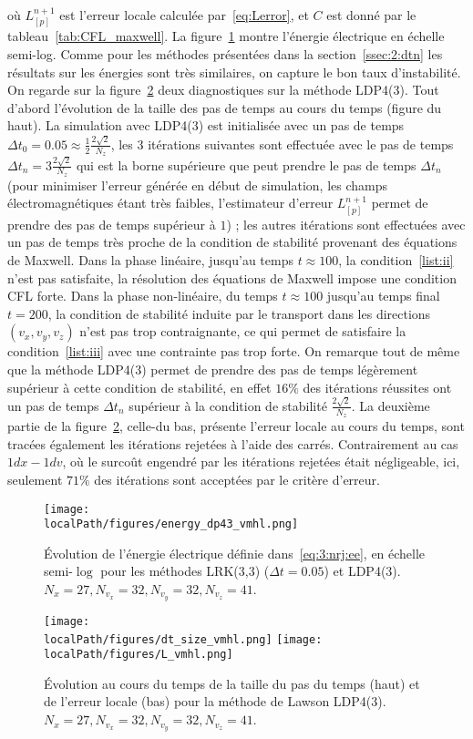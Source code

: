 où $L_{[p]}^{n+1}$ est l'erreur locale calculée par~\ref{eq:Lerror}, et $C$ est donné par le tableau~\ref{tab:CFL_maxwell}. La figure~\ref{fig:energieselecdp43} montre l'énergie électrique en échelle semi-log. Comme pour les méthodes présentées dans la section~\ref{ssec:2:dtn} les résultats sur les énergies sont très similaires, on capture le bon taux d'instabilité. On regarde sur la figure~\ref{fig:dtanderrordp43} deux diagnostiques sur la méthode LDP4(3). Tout d'abord l'évolution de la taille des pas de temps au cours du temps (figure du haut). La simulation avec LDP4(3) est initialisée avec un pas de temps $\Delta t_0=0.05\approx\frac{1}{2}\frac{2\sqrt{2}}{N_z}$, les 3 itérations suivantes sont effectuée avec le pas de temps $\Delta t_n=3\frac{2\sqrt{2}}{N_z}$ qui est la borne supérieure que peut prendre le pas de temps $\Delta t_n$ (pour minimiser l'erreur générée en début de simulation, les champs électromagnétiques étant très faibles, l'estimateur d'erreur $L_{[p]}^{n+1}$ permet de prendre des pas de temps supérieur à $1$) ; les autres itérations sont effectuées avec un pas de temps très proche de la condition de stabilité provenant des équations de Maxwell. Dans la phase linéaire, jusqu'au temps $t\approx 100$, la condition~\ref{list:ii} n'est pas satisfaite, la résolution des équations de Maxwell impose une condition CFL forte. Dans la phase non-linéaire, du temps $t\approx100$ jusqu'au temps final $t=200$, la condition de stabilité induite par le transport dans les directions $(v_x,v_y,v_z)$ n'est pas trop contraignante, ce qui permet de satisfaire la condition~\ref{list:iii} avec une contrainte pas trop forte. On remarque tout de même que la méthode LDP4(3) permet de prendre des pas de temps légèrement supérieur à cette condition de stabilité, en effet $16\%$ des itérations réussites ont un pas de temps $\Delta t_n$ supérieur à la condition de stabilité $\frac{2\sqrt{2}}{N_z}$. La deuxième partie de la figure~\ref{fig:dtanderrordp43}, celle-du bas, présente l'erreur locale au cours du temps, sont tracées également les itérations rejetées à l'aide des carrés. Contrairement au cas $1dx-1dv$, où le surcoût engendré par les itérations rejetées était négligeable, ici, seulement $71\%$ des itérations sont acceptées par le critère d'erreur.

\begin{figure}[h]
  \centering
  \texttt{[image: \\localPath/figures/energy\_dp43\_vmhl.png]}
  \caption{Évolution de l'énergie électrique définie dans~\eqref{eq:3:nrj:ee}, en échelle semi-$\log$ pour les méthodes LRK(3,3) ($\Delta t = 0.05$) et LDP4(3). $N_x=27, N_{v_x}=32, N_{v_y}=32, N_{v_z}=41$.}
  \label{fig:energieselecdp43}
\end{figure}

\begin{figure}[h]
  \centering
  \texttt{[image: \\localPath/figures/dt\_size\_vmhl.png]}
  \texttt{[image: \\localPath/figures/L\_vmhl.png]}
  \caption{Évolution au cours du temps de la taille du pas du temps (haut) et de l'erreur locale (bas) pour la méthode de Lawson LDP4(3). $N_x=27, N_{v_x}=32, N_{v_y}=32, N_{v_z}=41$.}
  \label{fig:dtanderrordp43}
\end{figure}

